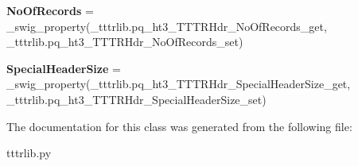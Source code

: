 \begin{DoxyCompactItemize}
{\bfseries No\+Of\+Records} = \+\_\+swig\+\_\+property(\+\_\+tttrlib.\+pq\+\_\+ht3\+\_\+\+T\+T\+T\+R\+Hdr\+\_\+\+No\+Of\+Records\+\_\+get, \+\_\+tttrlib.\+pq\+\_\+ht3\+\_\+\+T\+T\+T\+R\+Hdr\+\_\+\+No\+Of\+Records\+\_\+set)
\item 
\mbox{\label{classtttrlib_1_1pq__ht3___t_t_t_r_hdr_a6ee3f6574b934bfa0b71995725291237}} 
{\bfseries Special\+Header\+Size} = \+\_\+swig\+\_\+property(\+\_\+tttrlib.\+pq\+\_\+ht3\+\_\+\+T\+T\+T\+R\+Hdr\+\_\+\+Special\+Header\+Size\+\_\+get, \+\_\+tttrlib.\+pq\+\_\+ht3\+\_\+\+T\+T\+T\+R\+Hdr\+\_\+\+Special\+Header\+Size\+\_\+set)
\end{DoxyCompactItemize}


The documentation for this class was generated from the following file\+:\begin{DoxyCompactItemize}
\item 
tttrlib.\+py\end{DoxyCompactItemize}
